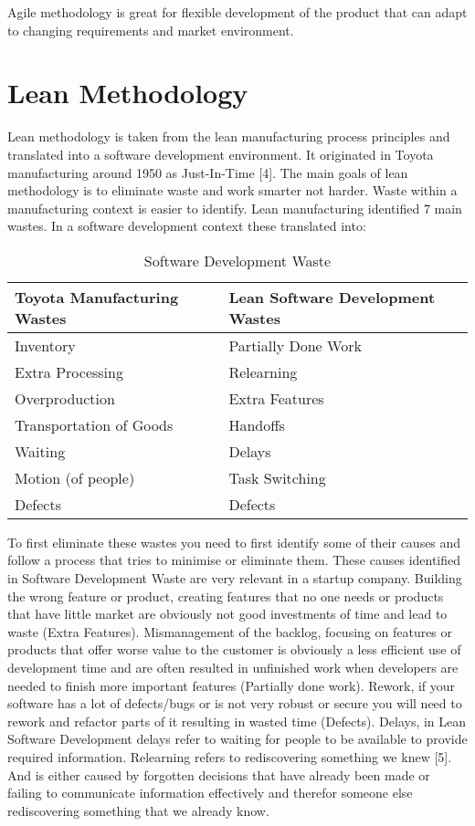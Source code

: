 Agile methodology is great for flexible development of the product that can adapt to
changing requirements and market environment.

\section{Lean Methodology}
Lean methodology is taken from the lean manufacturing process principles and translated into a software development environment. It originated in Toyota manufacturing around 1950 as Just-In-Time [4]. The main goals of lean methodology is to eliminate waste and work smarter not harder. Waste within a manufacturing context is easier to identify. Lean
manufacturing identified 7 main wastes. In a software development context these translated
into:
\begin{table}[h]
	\centering
	\begin {tabular}{|l|l|}
	\hline
	Toyota Manufacturing Wastes & Lean Software Development Wastes \\ \hline
	Inventory & Partially Done Work \\
	Extra Processing & Relearning \\
	Overproduction & Extra Features \\
	Transportation of Goods & Handoffs \\
	Waiting & Delays \\
	Motion (of people) & Task Switching \\
	Defects & Defects \\ \hline
	\end{tabular}
	\caption{Software Development Waste\cite{}}
\end{table}

To first eliminate these wastes you need to first identify some of their causes and follow a process that tries to minimise or eliminate them. These causes identified in Software Development Waste are very relevant in a startup company.
Building the wrong feature or product, creating features that no one needs or products that have little market are obviously not good investments of time and lead to waste (Extra Features).
Mismanagement of the backlog, focusing on features or products that offer worse value to the customer is obviously a less efficient use of development time and are often resulted in unfinished work when developers are needed to finish more important features (Partially done work).
Rework, if your software has a lot of defects/bugs or is not very robust or secure you will need to rework and refactor parts of it resulting in wasted time (Defects). Delays, in Lean Software Development delays refer to waiting for people to be available to provide required information.
Relearning refers to rediscovering something we knew [5]. And is either caused by forgotten decisions that have already been made or failing to communicate information effectively and therefor someone else rediscovering something that we already know.

